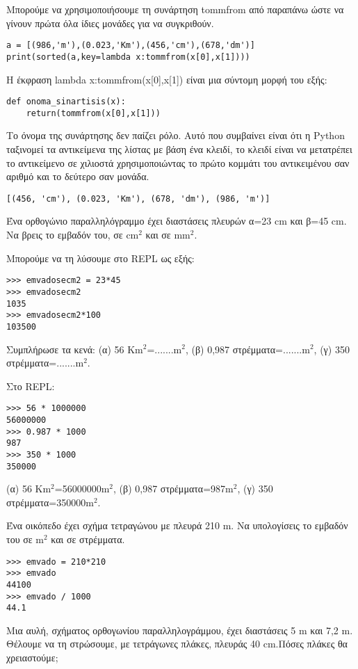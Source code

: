 Μπορούμε να χρησιμοποιήσουμε τη συνάρτηση tommfrom από παραπάνω ώστε να γίνουν πρώτα όλα ίδιες μονάδες για να συγκριθούν.
\begin{lstlisting}
a = [(986,'m'),(0.023,'Km'),(456,'cm'),(678,'dm')]
print(sorted(a,key=lambda x:tommfrom(x[0],x[1])))
\end{lstlisting}
Η έκφραση lambda x:tommfrom(x[0],x[1]) είναι μια σύντομη μορφή του εξής:
\begin{lstlisting}
def onoma_sinartisis(x):
    return(tommfrom(x[0],x[1]))
\end{lstlisting}
Το όνομα της συνάρτησης δεν παίζει ρόλο.
Αυτό που συμβαίνει είναι ότι η Python ταξινομεί τα αντικείμενα της λίστας με βάση ένα κλειδί, το κλειδί είναι να μετατρέπει το αντικείμενο σε χιλιοστά χρησιμοποιώντας το πρώτο κομμάτι του αντικειμένου σαν αριθμό και το δεύτερο σαν μονάδα.
\begin{lstlisting}
[(456, 'cm'), (0.023, 'Km'), (678, 'dm'), (986, 'm')]
\end{lstlisting}
\begin{exercise}
Ένα ορθογώνιο παραλληλόγραμμο έχει διαστάσεις πλευρών α=23 cm και β=45 cm.
Nα βρεις το εμβαδόν του, σε cm$^2$ και σε mm$^2$.
\end{exercise}
Μπορούμε να τη λύσουμε στο REPL ως εξής:
\begin{lstlisting}
>>> emvadosecm2 = 23*45
>>> emvadosecm2
1035
>>> emvadosecm2*100
103500
\end{lstlisting}
\begin{exercise}
Συμπλήρωσε τα κενά:
(α) 56 Km$^2$=.......m$^2$, (β) 0,987 στρέμματα=.......m$^2$, (γ) 350 στρέμματα=.......m$^2$.
\end{exercise}
Στο REPL:
\begin{lstlisting}
>>> 56 * 1000000
56000000
>>> 0.987 * 1000
987
>>> 350 * 1000
350000
\end{lstlisting}
(α) 56 Km$^2$=56000000m$^2$, (β) 0,987 στρέμματα=987m$^2$, (γ) 350 στρέμματα=350000m$^2$.
\begin{exercise}
Ένα οικόπεδο έχει σχήμα τετραγώνου με πλευρά 210 m. Να υπολογίσεις το εμβαδόν
του σε m$^2$ και σε στρέμματα.
\end{exercise}
\begin{lstlisting}
>>> emvado = 210*210
>>> emvado
44100
>>> emvado / 1000
44.1
\end{lstlisting}
\begin{exercise}
Μια αυλή, σχήματος ορθογωνίου παραλληλογράμμου, έχει διαστάσεις 5 m και 7,2 m. Θέλουμε
να τη στρώσουμε, με τετράγωνες πλάκες, πλευράς 40 cm.Πόσες πλάκες θα χρειαστούμε;
\end{exercise}
